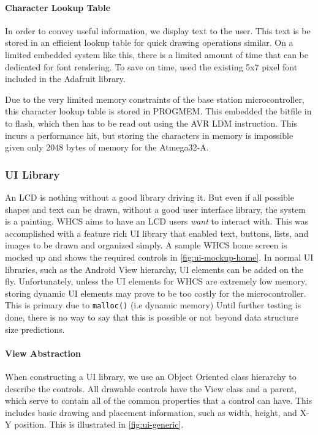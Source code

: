 \paragraph{Character Lookup Table}
In order to convey useful information, we display text to the
user. This text is be stored in an efficient lookup table for quick drawing
operations similar. On a limited embedded
system like this, there is a limited amount of time that can be dedicated for
font rendering. To save on time, used the existing 5x7 pixel font included in the 
Adafruit library.

Due to the very limited memory constraints of the base station microcontroller, 
this character lookup table is stored in PROGMEM. This embedded the bitfile in to
flash, which then has to be read out using the AVR LDM instruction. This incurs
a performance hit, but storing the characters in memory is impossible given
only 2048 bytes of memory for the Atmega32-A.

\subsubsection{UI Library}
\label{sec:ui-lib}
An LCD is nothing without a good library driving it. But even if all possible
shapes and text can be drawn, without a good user interface library, the system
is a painting. WHCS aims to have an LCD users \emph{want} to interact with.
This was accomplished with a feature rich UI library that enabled text,
buttons, lists, and images to be drawn and organized simply. A sample WHCS home screen is mocked up and shows the required controls in \autoref{fig:ui-mockup-home}. 
In normal UI libraries, such as the Android View hierarchy, UI elements can be added on the
fly. Unfortunately, unless the UI elements for WHCS are extremely low memory,
storing dynamic UI elements may prove to be too costly for the microcontroller.
This is primary due to \texttt{malloc()} (i.e dynamic memory)
Until further testing is done, there is no way to say that this is possible or
not beyond data structure size predictions.


\paragraph{View Abstraction}
When constructing a UI library, we use an Object Oriented class hierarchy
to describe the controls. All drawable controls have the View class and
a parent, which serve to contain all of the common properties that a
control can have. This includes basic drawing and placement information, such
as width, height, and X-Y position. This is illustrated in \autoref{fig:ui-generic}.

